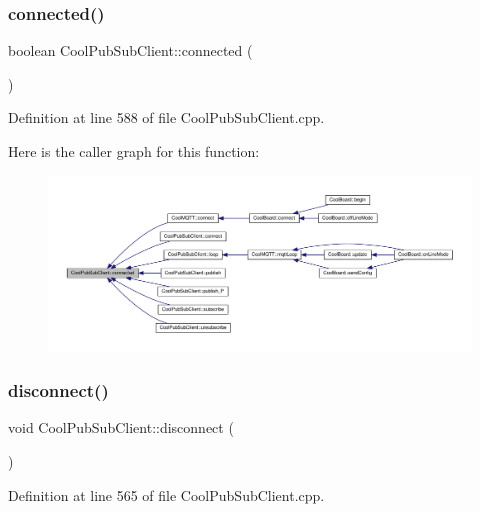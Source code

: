 \subsubsection{\texorpdfstring{connected()}{connected()}}
{\footnotesize\ttfamily boolean Cool\+Pub\+Sub\+Client\+::connected (\begin{DoxyParamCaption}{ }\end{DoxyParamCaption})}



Definition at line 588 of file Cool\+Pub\+Sub\+Client.\+cpp.

Here is the caller graph for this function\+:\nopagebreak
\begin{figure}[H]
\begin{center}
\leavevmode
\includegraphics[width=350pt]{class_cool_pub_sub_client_a3d5a5da4ddb1e5c1bea64d80c665d148_icgraph}
\end{center}
\end{figure}
\mbox{\label{class_cool_pub_sub_client_a60bd133e45bebc921f6df20f45106490}} 
\subsubsection{\texorpdfstring{disconnect()}{disconnect()}}
{\footnotesize\ttfamily void Cool\+Pub\+Sub\+Client\+::disconnect (\begin{DoxyParamCaption}{ }\end{DoxyParamCaption})}



Definition at line 565 of file Cool\+Pub\+Sub\+Client.\+cpp.

\mbox{\label{class_cool_pub_sub_client_ac3c8bf1daed573d1ffa8b5c1fcb13f98}} 
